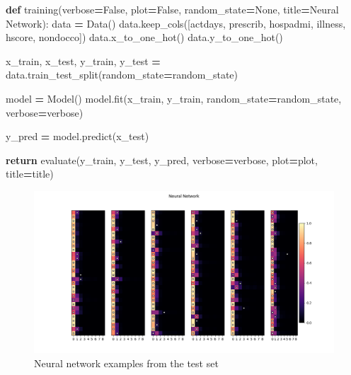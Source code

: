\documentclass[
]{article}
\newenvironment{Shaded}{\begin{snugshade}}{\end{snugshade}}
\newcommand{\ControlFlowTok}[1]{\textcolor[rgb]{0.13,0.29,0.53}{\textbf{#1}}}
\newcommand{\KeywordTok}[1]{\textcolor[rgb]{0.13,0.29,0.53}{\textbf{#1}}}
\newcommand{\NormalTok}[1]{#1}
\newcommand{\OperatorTok}[1]{\textcolor[rgb]{0.81,0.36,0.00}{\textbf{#1}}}
\newcommand{\StringTok}[1]{\textcolor[rgb]{0.31,0.60,0.02}{#1}}
\newcommand{\VariableTok}[1]{\textcolor[rgb]{0.00,0.00,0.00}{#1}}
\begin{document}
\begin{Shaded}
\begin{Highlighting}[]
\KeywordTok{def}\NormalTok{ training(verbose}\OperatorTok{=}\VariableTok{False}\NormalTok{, plot}\OperatorTok{=}\VariableTok{False}\NormalTok{, random\_state}\OperatorTok{=}\VariableTok{None}\NormalTok{, title}\OperatorTok{=}\StringTok{\textquotesingle{}Neural Network\textquotesingle{}}\NormalTok{):}
\NormalTok{    data }\OperatorTok{=}\NormalTok{ Data()}
\NormalTok{    data.keep\_cols([}\StringTok{\textquotesingle{}actdays\textquotesingle{}}\NormalTok{, }\StringTok{\textquotesingle{}prescrib\textquotesingle{}}\NormalTok{, }\StringTok{\textquotesingle{}hospadmi\textquotesingle{}}\NormalTok{, }\StringTok{\textquotesingle{}illness\textquotesingle{}}\NormalTok{, }\StringTok{\textquotesingle{}hscore\textquotesingle{}}\NormalTok{, }\StringTok{\textquotesingle{}nondocco\textquotesingle{}}\NormalTok{])}
\NormalTok{    data.x\_to\_one\_hot()}
\NormalTok{    data.y\_to\_one\_hot()}

\NormalTok{    x\_train, x\_test, y\_train, y\_test }\OperatorTok{=}\NormalTok{ data.train\_test\_split(random\_state}\OperatorTok{=}\NormalTok{random\_state)}

\NormalTok{    model }\OperatorTok{=}\NormalTok{ Model()}
\NormalTok{    model.fit(x\_train, y\_train, random\_state}\OperatorTok{=}\NormalTok{random\_state, verbose}\OperatorTok{=}\NormalTok{verbose)}

\NormalTok{    y\_pred }\OperatorTok{=}\NormalTok{ model.predict(x\_test)}

    \ControlFlowTok{return}\NormalTok{ evaluate(y\_train, y\_test, y\_pred, verbose}\OperatorTok{=}\NormalTok{verbose, plot}\OperatorTok{=}\NormalTok{plot, title}\OperatorTok{=}\NormalTok{title)}
\end{Highlighting}
\end{Shaded}

\begin{figure}
\centering
\includegraphics{figures/neural_net.png}
\caption{Neural network examples from the test set}
\end{figure}
\end{document}
